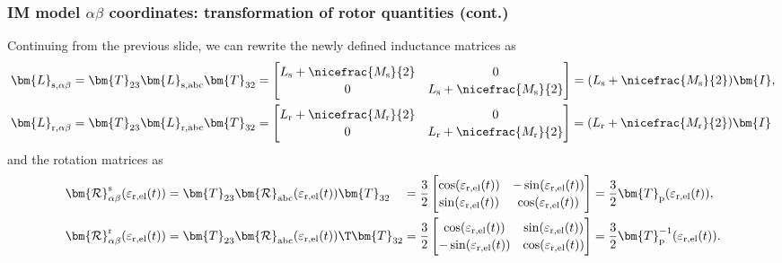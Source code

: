 \begin{frame}
	\frametitle{IM model $\alpha\beta$ coordinates: transformation of rotor quantities (cont.)}
    Continuing from the previous slide, we can rewrite the newly defined inductance matrices as
    \begin{equation}
        \begin{split}
            \bm{L}_{\mathrm{s},\alpha\beta} &= \bm{T}_{23} \bm{L}_{\mathrm{s,abc}}\bm{T}_{32} = \begin{bmatrix}
                L_\mathrm{s} +\nicefrac{M_\mathrm{s}}{2}& 0  \\ 0 &  L_\mathrm{s} +\nicefrac{M_\mathrm{s}}{2} 
            \end{bmatrix} = (L_\mathrm{s} +\nicefrac{M_\mathrm{s}}{2}) \bm{I},\\
            \bm{L}_{\mathrm{r},\alpha\beta} &= \bm{T}_{23} \bm{L}_{\mathrm{r,abc}}\bm{T}_{32} = \begin{bmatrix}
                L_\mathrm{r} +\nicefrac{M_\mathrm{r}}{2}& 0  \\ 0 &  L_\mathrm{r} +\nicefrac{M_\mathrm{r}}{2} 
            \end{bmatrix}= (L_\mathrm{r} +\nicefrac{M_\mathrm{r}}{2}) \bm{I}
        \end{split}
        \label{eq:IM_model_alpha_beta_inductance_matrices}
    \end{equation}
    and the rotation matrices as
    \begin{equation}
        \renewcommand{\arraystretch}{1.15}
        \begin{alignedat}{2}
            \bm{\mathcal{R}}^\mathrm{s}_{\alpha\beta}(\varepsilon_\mathrm{r,el}(t)) &= \bm{T}_{23}\bm{\mathcal{R}}_\mathrm{abc}(\varepsilon_\mathrm{r,el}(t))\bm{T}_{32} &&= \frac{3}{2}\begin{bmatrix}
                \cos(\varepsilon_\mathrm{r,el}(t)) & -\sin(\varepsilon_\mathrm{r,el}(t))\\
                \sin(\varepsilon_\mathrm{r,el}(t)) & \cos(\varepsilon_\mathrm{r,el}(t))
            \end{bmatrix} = \frac{3}{2}\bm{T}_\mathrm{p}(\varepsilon_\mathrm{r,el}(t)),\\
            \bm{\mathcal{R}}^\mathrm{r}_{\alpha\beta}(\varepsilon_\mathrm{r,el}(t)) &= \bm{T}_{23}\bm{\mathcal{R}}_\mathrm{abc}(\varepsilon_\mathrm{r,el}(t))\T\bm{T}_{32} &&= \frac{3}{2}\begin{bmatrix}
                \cos(\varepsilon_\mathrm{r,el}(t)) & \sin(\varepsilon_\mathrm{r,el}(t))\\
                -\sin(\varepsilon_\mathrm{r,el}(t)) & \cos(\varepsilon_\mathrm{r,el}(t))
            \end{bmatrix} = \frac{3}{2}\bm{T}_\mathrm{p}^{-1}(\varepsilon_\mathrm{r,el}(t)).
        \end{alignedat}
        \label{eq:IM_model_alpha_beta_rotation_matrices}
    \end{equation}
\end{frame}

